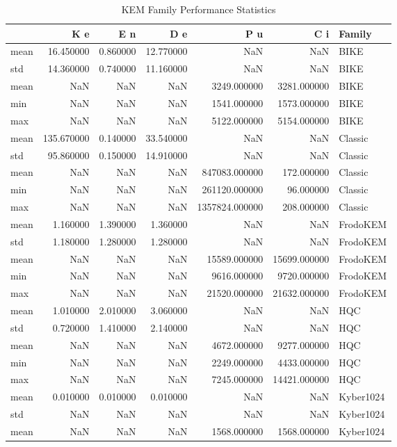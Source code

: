\begin{table}
\caption{KEM Family Performance Statistics}
\label{tab:kem_family_stats}
\begin{tabular}{lrrrrrl}
\toprule
 & K e & E n & D e & P u & C i & Family \\
\midrule
mean & 16.450000 & 0.860000 & 12.770000 & NaN & NaN & BIKE \\
std & 14.360000 & 0.740000 & 11.160000 & NaN & NaN & BIKE \\
mean & NaN & NaN & NaN & 3249.000000 & 3281.000000 & BIKE \\
min & NaN & NaN & NaN & 1541.000000 & 1573.000000 & BIKE \\
max & NaN & NaN & NaN & 5122.000000 & 5154.000000 & BIKE \\
mean & 135.670000 & 0.140000 & 33.540000 & NaN & NaN & Classic \\
std & 95.860000 & 0.150000 & 14.910000 & NaN & NaN & Classic \\
mean & NaN & NaN & NaN & 847083.000000 & 172.000000 & Classic \\
min & NaN & NaN & NaN & 261120.000000 & 96.000000 & Classic \\
max & NaN & NaN & NaN & 1357824.000000 & 208.000000 & Classic \\
mean & 1.160000 & 1.390000 & 1.360000 & NaN & NaN & FrodoKEM \\
std & 1.180000 & 1.280000 & 1.280000 & NaN & NaN & FrodoKEM \\
mean & NaN & NaN & NaN & 15589.000000 & 15699.000000 & FrodoKEM \\
min & NaN & NaN & NaN & 9616.000000 & 9720.000000 & FrodoKEM \\
max & NaN & NaN & NaN & 21520.000000 & 21632.000000 & FrodoKEM \\
mean & 1.010000 & 2.010000 & 3.060000 & NaN & NaN & HQC \\
std & 0.720000 & 1.410000 & 2.140000 & NaN & NaN & HQC \\
mean & NaN & NaN & NaN & 4672.000000 & 9277.000000 & HQC \\
min & NaN & NaN & NaN & 2249.000000 & 4433.000000 & HQC \\
max & NaN & NaN & NaN & 7245.000000 & 14421.000000 & HQC \\
mean & 0.010000 & 0.010000 & 0.010000 & NaN & NaN & Kyber1024 \\
std & NaN & NaN & NaN & NaN & NaN & Kyber1024 \\
mean & NaN & NaN & NaN & 1568.000000 & 1568.000000 & Kyber1024 \\

\end{tabular}
\end{table}
